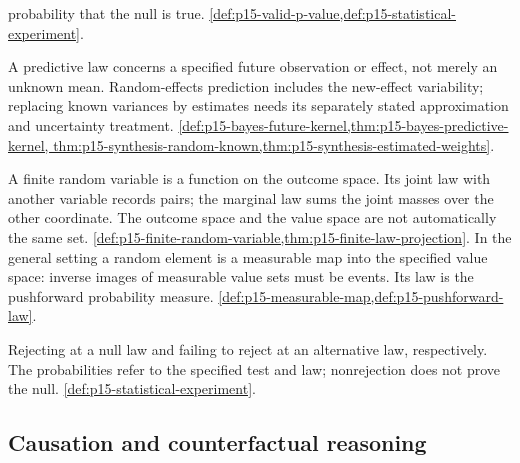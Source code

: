\begin{description}[style=nextline,leftmargin=0pt]
probability that the null is true.
\cref{def:p15-valid-p-value,def:p15-statistical-experiment}.
\item[Prediction; prediction interval.]
A predictive law concerns a specified future observation or effect,
not merely an unknown mean. Random-effects prediction includes the
new-effect variability; replacing known variances by estimates needs
its separately stated approximation and uncertainty treatment.
\cref{def:p15-bayes-future-kernel,thm:p15-bayes-predictive-kernel,
thm:p15-synthesis-random-known,thm:p15-synthesis-estimated-weights}.
\item[Random variable; joint law; marginal law.]
A finite random variable is a function on the outcome space. Its joint
law with another variable records pairs; the marginal law sums the joint
masses over the other coordinate. The outcome space and the value space
are not automatically the same set.
\cref{def:p15-finite-random-variable,thm:p15-finite-law-projection}.
In the general setting a random element is a measurable map into the
specified value space: inverse images of measurable value sets must be
events. Its law is the pushforward probability measure.
\cref{def:p15-measurable-map,def:p15-pushforward-law}.
\item[Type-I error; type-II error.]
Rejecting at a null law and failing to reject at an alternative law,
respectively. The probabilities refer to the specified test and law;
nonrejection does not prove the null.
\cref{def:p15-statistical-experiment}.
\end{description}

\subsection{Causation and counterfactual reasoning}
\label{sec:p14-glossary-causation}

